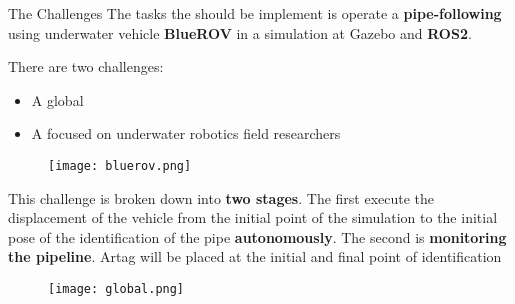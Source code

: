 \begin{frame}[t]{The Challenges} 
   The tasks the should be implement is operate a \textbf{pipe-following} using  underwater vehicle \textbf{BlueROV} in a simulation at Gazebo and \textbf{ROS2}.

   There are two challenges: \\
   \begin{itemize}

      \item A global
      \item A focused on underwater robotics field researchers
   \end{itemize}

   \begin{center}
    \begin{figure}
        \texttt{[image: bluerov.png]}               
       
    \end{figure}

    \end{center}


\end{frame}


\begin{frame}{}
    \transdissolve[duration=0.5]
   
    \begin{center}
    \end{center}
\end{frame}



\begin{frame}{}
    This challenge is broken down into \textbf{two stages}. The first execute the displacement of the vehicle from the initial point of the simulation to the initial pose of the identification of the pipe \textbf{autonomously}. The second is \textbf{monitoring the pipeline}. Artag will be placed at the initial and final point of identification



    \begin{center}
        \begin{figure}
            \texttt{[image: global.png]}               
           
        \end{figure}
    
        \end{center}
   
\end{frame}

